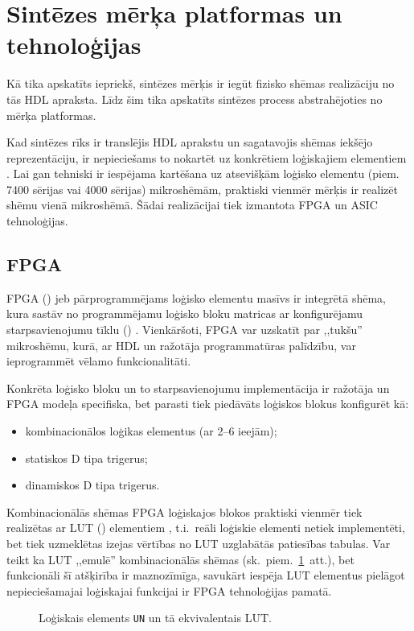 \section{Sintēzes mērķa platformas un tehnoloģijas} \label{sec:synth}
Kā tika apskatīts iepriekš, sintēzes mērķis ir iegūt fizisko shēmas
realizāciju no tās HDL apraksta. Līdz šim tika apskatīts sintēzes process
abstrahējoties no mērķa platformas.

Kad sintēzes rīks ir translējis HDL aprakstu un sagatavojis shēmas 
iekšējo repre\-zen\-tā\-ciju, ir nepieciešams to nokartēt uz konkrētiem
loģiskajiem elementiem \cite[5.~lpp.]{HDL}.
Lai gan tehniski ir iespējama kartēšana uz
atsevišķām loģisko elementu (piem. 7400 sērijas vai 4000 sērijas)
mikroshēmām, praktiski vienmēr mērķis ir realizēt shēmu vienā
mikroshēmā. Šādai realizācijai tiek izmantota FPGA un ASIC tehnoloģijas.

\subsection{FPGA} \label{sec:fpga}
	FPGA () jeb pārprogrammējams
	loģisko elementu masīvs ir integrētā shēma, kura sastāv no
	programmējamu loģisko bloku matricas ar konfigurējamu starpsavienojumu
	tīklu ()
	\cite[370.~lpp.]{Perry-VHDL}\cite{SmartFusionFabric}\cite{Xilinx7}.
	Vienkāršoti, FPGA var uzskatīt par ,,tukšu'' mikroshēmu, kurā, ar HDL
	un ražotāja programmatūras palīdzību, var ieprogrammēt vēlamo
	funkcionalitāti.
	
	Konkrēta loģisko bloku un to starpsavienojumu implementācija ir ražotāja un 
	FPGA modeļa	specifiska\cite{SmartFusionFabric}\cite{Xilinx7}, 
	bet parasti tiek piedāvāts loģiskos blokus konfigurēt kā:
	\begin{itemize}
		\item kombinacionālos loģikas elementus (ar 2--6 ieejām);
		\item statiskos D tipa trigerus;
		\item dinamiskos D tipa trigerus.
	\end{itemize}
	
	Kombinacionālās shēmas FPGA loģiskajos blokos praktiski vienmēr tiek
	realizētas ar LUT () elementiem%
	\cite{SmartFusionFabric}\cite{Xilinx7}, t.i.~reāli loģiskie elementi
	netiek imple\-men\-tēti, bet tiek uzmeklētas izejas vērtības no LUT
	uzglabātās patiesības tabulas. Var teikt ka LUT ,,emulē'' 
	kombinacionālās shēmas (sk.~piem.~\ref{fig:and2lut}~att.),
	bet funkcionāli šī atšķirība ir maznozīmīga, savukārt
	iespēja LUT elementus pielāgot nepieciešamajai loģiskajai funkcijai ir 
	FPGA tehnoloģijas pamatā.
	\begin{figure}[hb]
		\centering
		{\ttfamily\small}
		\caption{Loģiskais elements \texttt{UN} un tā ekvivalentais LUT.}
		\label{fig:and2lut}
	\end{figure}
	
